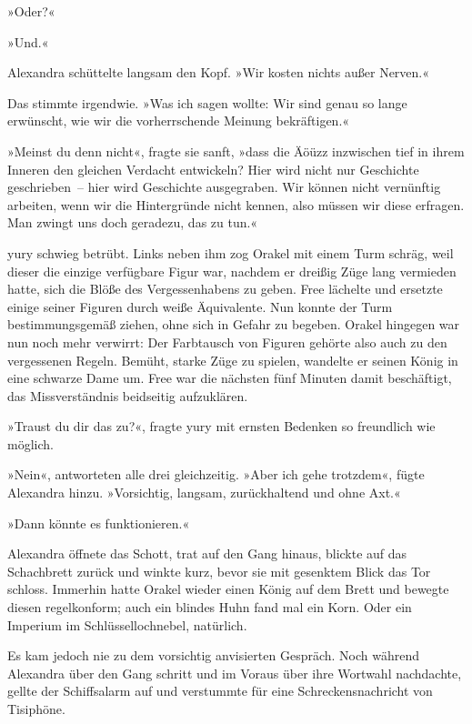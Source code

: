 »Oder?«

»Und.«

Alexandra schüttelte langsam den Kopf. »Wir kosten nichts außer Nerven.«

Das stimmte irgendwie. »Was ich sagen wollte: Wir sind genau so lange erwünscht, wie wir die vorherrschende Meinung bekräftigen.«

»Meinst du denn nicht«, fragte sie sanft, »dass die Äöüzz inzwischen tief in ihrem Inneren den gleichen Verdacht entwickeln? Hier wird nicht nur Geschichte geschrieben~– hier wird Geschichte ausgegraben. Wir können nicht vernünftig arbeiten, wenn wir die Hintergründe nicht kennen, also müssen wir diese erfragen. Man zwingt uns doch geradezu, das zu tun.«

yury schwieg betrübt. Links neben ihm zog Orakel mit einem Turm schräg, weil dieser die einzige verfügbare Figur war, nachdem er dreißig Züge lang vermieden hatte, sich die Blöße des Vergessenhabens zu geben. Free lächelte und ersetzte einige seiner Figuren durch weiße Äquivalente. Nun konnte der Turm bestimmungsgemäß ziehen, ohne sich in Gefahr zu begeben. Orakel hingegen war nun noch mehr verwirrt: Der Farbtausch von Figuren gehörte also auch zu den vergessenen Regeln. Bemüht, starke Züge zu spielen, wandelte er seinen König in eine schwarze Dame um. Free war die nächsten fünf Minuten damit beschäftigt, das Missverständnis beidseitig aufzuklären.

»Traust du dir das zu?«, fragte yury mit ernsten Bedenken so freundlich wie möglich.

»Nein«, antworteten alle drei gleichzeitig. »Aber ich gehe trotzdem«, fügte Alexandra hinzu. »Vorsichtig, langsam, zurückhaltend und ohne Axt.«

»Dann könnte es funktionieren.«

Alexandra öffnete das Schott, trat auf den Gang hinaus, blickte auf das Schachbrett zurück und winkte kurz, bevor sie mit gesenktem Blick das Tor schloss. Immerhin hatte Orakel wieder einen König auf dem Brett und bewegte diesen regelkonform; auch ein blindes Huhn fand mal ein Korn. Oder ein Imperium im Schlüssellochnebel, natürlich.

Es kam jedoch nie zu dem vorsichtig anvisierten Gespräch. Noch während Alexandra über den Gang schritt und im Voraus über ihre Wortwahl nachdachte, gellte der Schiffsalarm auf und verstummte für eine Schreckensnachricht von Tisiphöne.


